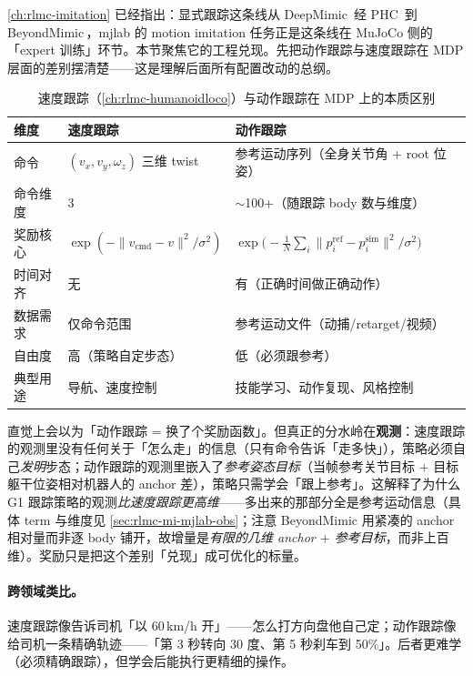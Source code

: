 \cref{ch:rlmc-imitation} 已经指出：显式跟踪这条线从 DeepMimic\,\cite{peng2018deepmimic} 经 PHC\,\cite{luo2023phc} 到 BeyondMimic\,\cite{liao2025beyondmimic}，mjlab 的 motion imitation 任务正是这条线在 MuJoCo 侧的「expert 训练」环节。本节聚焦它的工程兑现。先把动作跟踪与速度跟踪在 MDP 层面的差别摆清楚——这是理解后面所有配置改动的总纲。

\begin{table}[ht]
\centering
\small
\caption{速度跟踪（\cref{ch:rlmc-humanoidloco}）与动作跟踪在 MDP 上的本质区别}
\label{tab:rlmc-mi-mdp}
\begin{tabular}{@{}lll@{}}
\toprule
维度 & 速度跟踪 & 动作跟踪 \\
\midrule
命令 & $(v_x,v_y,\omega_z)$ 三维 twist & 参考运动序列（全身关节角 + root 位姿） \\
命令维度 & 3 & $\sim$100+（随跟踪 body 数与维度） \\
奖励核心 & $\exp(-\lVert v_{\text{cmd}}-v\rVert^2/\sigma^2)$ & $\exp\!\big(-\tfrac1N\sum_i\lVert p_i^{\text{ref}}-p_i^{\text{sim}}\rVert^2/\sigma^2\big)$ \\
时间对齐 & 无 & 有（正确时间做正确动作） \\
数据需求 & 仅命令范围 & 参考运动文件（动捕/retarget/视频） \\
自由度 & 高（策略自定步态） & 低（必须跟参考） \\
典型用途 & 导航、速度控制 & 技能学习、动作复现、风格控制 \\
\bottomrule
\end{tabular}
\end{table}

\begin{insight}\label{ins:rlmc-mi-obs}
直觉上会以为「动作跟踪 = 换了个奖励函数」。但真正的分水岭在\textbf{观测}：速度跟踪的观测里没有任何关于「怎么走」的信息（只有命令告诉「走多快」），策略必须自己\emph{发明}步态；动作跟踪的观测里嵌入了\emph{参考姿态目标}（当帧参考关节目标 $+$ 目标躯干位姿相对机器人的 anchor 差），策略只需学会「跟上参考」。这解释了为什么 G1 跟踪策略的观测\emph{比速度跟踪更高维}——多出来的那部分全是参考运动信息（具体 term 与维度见 \cref{sec:rlmc-mi-mjlab-obs}；注意 BeyondMimic 用紧凑的 anchor 相对量而非逐 body 铺开，故增量是\emph{有限的几维 anchor $+$ 参考目标}，而非上百维）。奖励只是把这个差别「兑现」成可优化的标量。
\end{insight}

\paragraph{跨领域类比。}速度跟踪像告诉司机「以 60\,km/h 开」——怎么打方向盘他自己定；动作跟踪像给司机一条精确轨迹——「第 3 秒转向 30 度、第 5 秒刹车到 50\%」。后者更难学（必须精确跟踪），但学会后能执行更精细的操作。

